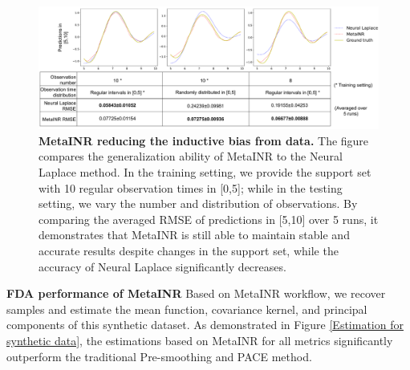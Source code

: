 \documentclass{article}
\begin{document}
\begin{figure}[htb]
  \centering
  \includegraphics[width=\textwidth]{ML_Compare.pdf}
  \caption{\textbf{MetaINR reducing the inductive bias from data.} The figure compares the generalization ability of MetaINR to the Neural Laplace method. 
  In the training setting, we provide the support set with 10 regular observation times in [0,5]; while in the testing setting,  we vary the number and distribution of observations.
  By comparing the averaged RMSE of predictions in [5,10] over 5 runs, it demonstrates that MetaINR is still able to maintain stable and accurate results despite changes in the support set, while the accuracy of Neural Laplace significantly decreases.
  }
  \label{ML_compare}
\end{figure}


\textbf{FDA performance of MetaINR}
Based on MetaINR workflow, we recover samples and estimate the mean function, covariance kernel, and principal components of this synthetic dataset. 
As demonstrated in Figure \ref{Estimation for synthetic data},
the estimations based on MetaINR for all metrics significantly outperform the traditional Pre-smoothing and PACE method. 
\end{document}
